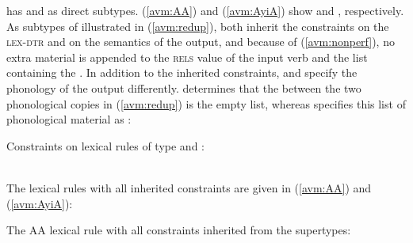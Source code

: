 has  and  as direct subtypes.
(\ref{avm:AA}) and (\ref{avm:AyiA}) show  and , respectively.
As subtypes of  illustrated in (\ref{avm:redup}), 
both inherit the constraints on the \textsc{lex-dtr} and on the semantics of the output, 
and because of (\ref{avm:nonperf}), no extra material is appended to the \textsc{rels} value of the input verb
and the list containing the .
 In addition to the inherited constraints,
 and  specify the phonology of the output differently.
 determines that the \etag between the two phonological copies in (\ref{avm:redup}) is the empty list, 
whereas  specifies this list of phonological material as :

\ea\label{avm:constr-AA}
Constraints on lexical rules of type  and :
 \ea   {} \impl \\%
\ex	{} \impl\\
\z
\z


\noindent
The lexical rules with all inherited constraints are given in (\ref{avm:AA}) and (\ref{avm:AyiA}):

\ea\label{avm:AA}
The AA lexical rule with all constraints inherited from the supertypes:\\
\z

